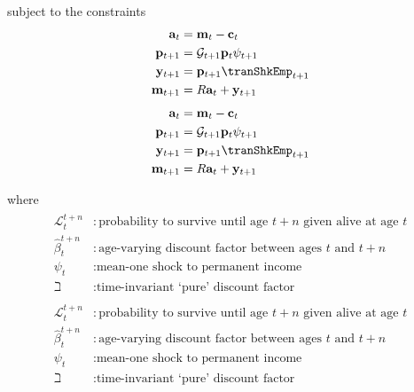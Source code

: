 \documentclass[titlepage, headings=optiontotocandhead]{econark}
\begin{document}
{subject to the constraints
  \begin{equation*}\begin{gathered}\begin{aligned}
        \mathbf{a}_{t}  & = \mathbf{m}_{t}-\mathbf{c}_{t}
        \\      \mathbf{p}_{t+1}  & = \mathcal{G}_{t+1}\mathbf{p}_{t}\psi_{t+1}
        \\      \mathbf{y}_{t+1}  & = \mathbf{p}_{t+1}\tranShkEmp _{t+1}
        \\      \mathbf{m}_{t+1}  & = R \mathbf{a}_{t}+\mathbf{y}_{t+1}
      \end{aligned}\end{gathered}\end{equation*}
  \begin{equation*}\begin{gathered}\begin{aligned}
        \mathbf{a}_{t}  & = \mathbf{m}_{t}-\mathbf{c}_{t}
        \\      \mathbf{p}_{t+1}  & = \mathcal{G}_{t+1}\mathbf{p}_{t}\psi_{t+1}
        \\      \mathbf{y}_{t+1}  & = \mathbf{p}_{t+1}\tranShkEmp _{t+1}
        \\      \mathbf{m}_{t+1}  & = R \mathbf{a}_{t}+\mathbf{y}_{t+1}
      \end{aligned}\end{gathered}\end{equation*}
 
where
  \begin{equation*}\begin{gathered}\begin{aligned}
        \mathcal{L} _{t}^{t+n} &:\text{probability to survive until age $t+n$ given alive at age $t$}
        \\      \hat{\beta}_{t}^{t+n} &:\text{age-varying discount factor between ages $t$ and $t+n$}
        \\     \psi_{t} &:\text{mean-one shock to permanent income}
        \\     \beth &:\text{time-invariant `pure' discount factor}
      \end{aligned}\end{gathered}\end{equation*}
  \begin{equation*}\begin{gathered}\begin{aligned}
        \mathcal{L} _{t}^{t+n} &:\text{probability to survive until age $t+n$ given alive at age $t$}
        \\      \hat{\beta}_{t}^{t+n} &:\text{age-varying discount factor between ages $t$ and $t+n$}
        \\     \psi_{t} &:\text{mean-one shock to permanent income}
        \\     \beth &:\text{time-invariant `pure' discount factor}
      \end{aligned}\end{gathered}\end{equation*}

}
\end{document}
